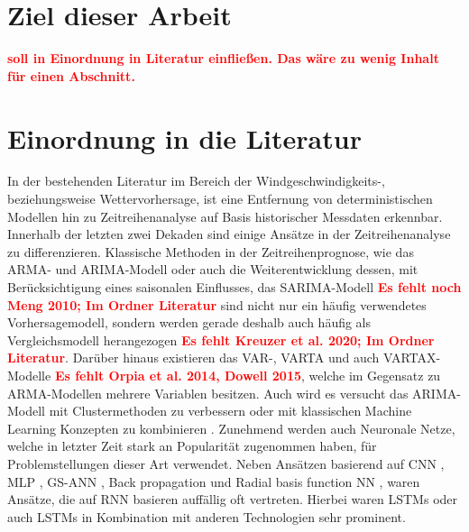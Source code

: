 \documentclass[
12pt, %
toc=listofnumbered, %
toc=chapterentrydotfill, %
numbers=noenddot, %
captions=tableheading, %
bibliography=numbered
]{scrreprt}
\let\Oldsection\section
\renewcommand{\section}{\FloatBarrier\Oldsection}
\newcommand{\highlight}[1]{\textbf{\textcolor{red}{#1}}}
\begin{document}
\section{Ziel dieser Arbeit}
\highlight{soll in Einordnung in Literatur einfließen. Das wäre zu wenig Inhalt für einen Abschnitt.}

\section{Einordnung in die Literatur}

In der bestehenden Literatur im Bereich der Windgeschwindigkeits-, beziehungsweise Wettervorhersage, ist eine Entfernung von 
deterministischen Modellen \cite{1963_Lorenz_DeterministicNonperiodicFlow} hin zu Zeitreihenanalyse auf Basis historischer Messdaten erkennbar. 
Innerhalb der letzten zwei Dekaden sind einige Ansätze in der Zeitreihenanalyse zu differenzieren. Klassische Methoden in der 
Zeitreihenprognose, wie das ARMA- und ARIMA-Modell \cite{2016_Cadenas_WindSpeedPrediction} oder auch 
die Weiterentwicklung dessen, mit Berücksichtigung eines saisonalen Einflusses, das SARIMA-Modell 
\highlight{Es fehlt noch Meng 2010; Im Ordner Literatur}\cite{2018_Alencar_HybridApproachCombining,2019_TenaGarcia_ForecastDailyOutput,2019_Haddad_WindSolarForecasting,2002_Igboekwe_StochasticSimulationHourly,2012_MuhammadSami_PredictionRateDust} sind 
nicht nur ein häufig verwendetes Vorhersagemodell, sondern werden gerade deshalb auch häufig als Vergleichsmodell herangezogen 
\highlight{Es fehlt Kreuzer et al. 2020; Im Ordner Literatur}\cite{2012_Cao_ForecastingWindSpeed}. Darüber hinaus existieren das VAR-, VARTA und auch VARTAX-Modelle 
\highlight{Es fehlt Orpia et al. 2014, Dowell 2015}\cite{2007_Ewing_TimeSeriesAnalysis,2015_He_SparsifiedVectorAutoregressive,2016_Koivisto_WindSpeedModeling}, 
welche im Gegensatz zu ARMA-Modellen mehrere Variablen besitzen. Auch wird es versucht das ARIMA-Modell mit Clustermethoden 
zu verbessern oder mit klassischen Machine Learning Konzepten zu kombinieren \cite{2017_Zhang_HybridMethodShortTerm,2011_Guo_CorrectedHybridApproach}. 
Zunehmend werden auch Neuronale Netze, welche in letzter Zeit stark an Popularität zugenommen haben, für Problemstellungen dieser 
Art verwendet. Neben Ansätzen basierend auf CNN \cite{2020_Zhao_ShorttermAverageWind,2019_Chen_MultifactorSpatiotemporalCorrelation}, MLP \cite{2019_Samet_EvaluationNeuralNetworkbased}, 
GS-ANN \cite{2019_Khodayar_IntervalDeepGenerative}, Back propagation \cite{2012_Wang_ShorttermWindSpeed} und Radial basis function NN \cite{2017_Chang_ImprovedNeuralNetworkbased}, 
waren Ansätze, die auf RNN basieren auffällig oft vertreten. Hierbei waren LSTMs \cite{2018_Dong_WindPowerPrediction,2020_Delgado_WindTurbineData,2020_Moharm_WindSpeedForecast,2019_Prabha_WindSpeedForecasting,2019_Cali_ShorttermWindPower} oder auch LSTMs in Kombination mit 
anderen Technologien \cite{2019_Chen_MultifactorSpatiotemporalCorrelation,2016_Allende_RecurrentNetworksWind,2018_Liu_WindSpeedForecasting,2018_Yao_MultidimensionalLSTMNetworks} sehr prominent. 
\end{document}
